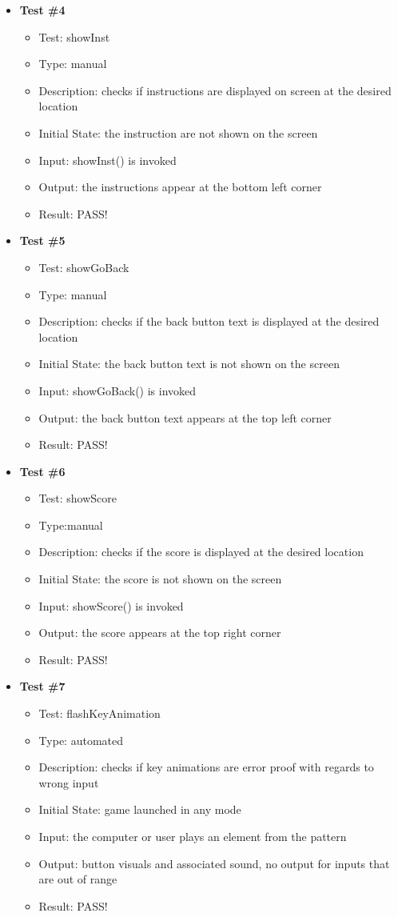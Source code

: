 \documentclass[12pt, titlepage]{article}
\begin{document}
\begin{itemize}
\begin{itemize}
\item \textbf {Test \#4}
\begin{itemize}
\item{Test: showInst}
\item{Type: manual}
\item{Description: checks if instructions are displayed on screen at the desired location}
\item{Initial State: the instruction are not shown on the screen}
\item{Input: showInst() is invoked}
\item{Output: the instructions appear at the bottom left corner}
\item{Result: PASS!}
\end{itemize}

\item \textbf {Test \#5}
\begin{itemize}
\item{Test: showGoBack}
\item{Type: manual}
\item{Description: checks if the back button text is displayed at the desired location}
\item{Initial State: the back button text is not shown on the screen}
\item{Input: showGoBack() is invoked}
\item{Output: the back button text appears at the top left corner}
\item{Result: PASS!}
\end{itemize}

\item \textbf {Test \#6}
\begin{itemize}
\item{Test: showScore}
\item{Type:manual }
\item{Description: checks if the score is displayed at the desired location}
\item{Initial State: the score is not shown on the screen}
\item{Input: showScore() is invoked}
\item{Output: the score appears at the top right corner}
\item{Result: PASS!}
\end{itemize}

\item \textbf {Test \#7}
\begin{itemize}
\item{Test: flashKeyAnimation}
\item{Type: automated}
\item{Description: checks if key animations are error proof with regards to wrong input}
\item{Initial State: game launched in any mode}
\item{Input: the computer or user plays an element from the pattern}
\item{Output: button visuals and associated sound, no output for inputs that are out of range}
\item{Result: PASS!}
\end{itemize}


\end{itemize}
\end{itemize}
\end{document}

